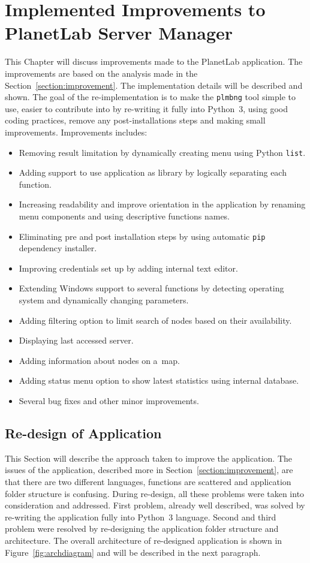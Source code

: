\chapter{Implemented Improvements to PlanetLab Server Manager}
\label{chapter:improve}
This Chapter will discuss improvements made to the PlanetLab application. The improvements are based on the analysis made in the Section~\ref{section:improvement}. The implementation details will be described and shown. The goal of the re-implementation is to make the \texttt{plmbng} tool simple to use, easier to contribute into by re-writing it fully into Python~3, using good coding practices, remove any post-installations steps and making small improvements. Improvements includes:
\begin{itemize}
	\item Removing result limitation by dynamically creating menu using Python \texttt{list}.
	\item Adding support to use application as library by logically separating each function.
	\item Increasing readability and improve orientation in the application by renaming menu components and using descriptive functions names.
	\item Eliminating pre and post installation steps by using automatic \texttt{pip} dependency installer.
	\item Improving credentials set up by adding internal text editor.
	\item Extending Windows support to several functions by detecting operating system and dynamically changing parameters.
	\item Adding filtering option to limit search of nodes based on their availability.
	\item Displaying last accessed server.
	\item Adding information about nodes on a~map.
	\item Adding status menu option to show latest statistics using internal database.
	\item Several bug fixes and other minor improvements.
\end{itemize}

\section{Re-design of Application}
\label{section:redesign}
This Section will describe the approach taken to improve the application. The issues of the application, described more in Section~\ref{section:improvement}, are that there are two different languages, functions are scattered and application folder structure is confusing. During re-design, all these problems were taken into consideration and addressed. First problem, already well described, was solved by re-writing the application fully into Python~3 language. Second and third problem were resolved by re-designing the application folder structure and architecture. The overall architecture of re-designed application is shown in Figure~\ref{fig:archdiagram} and will be described in the next paragraph.\\

